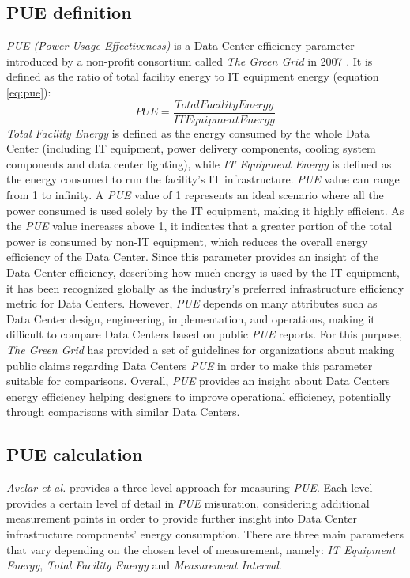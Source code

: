 \subsection{PUE definition}
\emph{PUE (Power Usage Effectiveness)} is a Data Center efficiency parameter introduced by a non-profit consortium called \emph{The Green Grid} in 2007 \cite{avelar2012pue}. It is defined as the ratio of total facility energy to IT equipment energy (equation \ref{eq:pue}):
\begin{displaymath} \label{eq:pue}
    PUE = \frac{Total Facility Energy}{IT Equipment Energy}
\end{displaymath}
\emph{Total Facility Energy} is defined as the energy consumed by the whole Data Center (including IT equipment, power delivery components, cooling system components and data center lighting), while \emph{IT Equipment Energy} is defined as the energy consumed to run the facility's IT infrastructure. \emph{PUE} value can range from 1 to infinity. A \emph{PUE} value of 1 represents an ideal scenario where all the power consumed is used solely by the IT equipment, making it highly efficient. As the \emph{PUE} value increases above 1, it indicates that a greater portion of the total power is consumed by non-IT equipment, which reduces the overall energy efficiency of the Data Center. Since this parameter provides an insight of the Data Center efficiency, describing how much energy is used by the IT equipment, it has been recognized globally as the industry's preferred infrastructure efficiency metric for Data Centers. However, \emph{PUE} depends on many attributes such as Data Center design, engineering, implementation, and operations, making it difficult to compare Data Centers based on public \emph{PUE} reports. For this purpose, \emph{The Green Grid} has provided a set of guidelines for organizations about making public claims regarding Data Centers \emph{PUE} in order to make this parameter suitable for comparisons. Overall, \emph{PUE} provides an insight about Data Centers energy efficiency helping designers to improve operational efficiency, potentially through comparisons with similar Data Centers. 

\subsection{PUE calculation}
\emph{Avelar et al.} \cite{avelar2012pue} provides a three-level approach for measuring \emph{PUE}. Each level provides a certain level of detail in \emph{PUE} misuration, considering additional measurement points in order to provide further insight into Data Center infrastructure components' energy consumption. There are three main parameters that vary depending on the chosen level of measurement, namely: \emph{IT Equipment Energy}, \emph{Total Facility Energy} and \emph{Measurement Interval}. 

